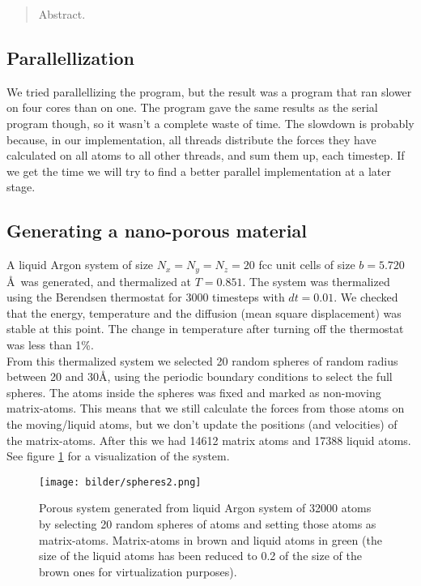 \begin{abstract}
Abstract.
\end{abstract}

\subsection*{Parallellization}
We tried parallellizing the program, but the result was a program that ran slower on four cores than on one. The program gave the same results as the serial program though, so it wasn't a complete waste of time. The slowdown is probably because, in our implementation, all threads distribute the forces they have calculated on all atoms to all other threads, and sum them up, each timestep. If we get the time we will try to find a better parallel implementation at a later stage.

\subsection*{Generating a nano-porous material}
\setcounter{equation}{1}
A liquid Argon system of size $N_x = N_y = N_z = 20$ fcc unit cells of size $b = 5.720$\AA\ was generated, and thermalized at $T = 0.851$. The system was thermalized using the Berendsen thermostat for 3000 timesteps with $dt = 0.01$. We checked that the energy, temperature and the diffusion (mean square displacement) was stable at this point. The change in temperature after turning off the thermostat was less than 1\%. \\

From this thermalized system we selected 20 random spheres of random radius between 20 and 30\AA, using the periodic boundary conditions to select the full spheres. The atoms inside the spheres was fixed and marked as non-moving matrix-atoms. This means that we still calculate the forces from those atoms on the moving/liquid atoms, but we don't update the positions (and velocities) of the matrix-atoms. After this we had 14612 matrix atoms and 17388 liquid atoms. See figure \ref{fig:spheres} for a visualization of the system. \\

\begin{figure}[ht!]
    \centering
    \texttt{[image: bilder/spheres2.png]}
    \parbox{0.8\textwidth}{
        \caption{
            \small{
                Porous system generated from liquid Argon system of 32000 atoms by selecting 20 random spheres of atoms and setting those atoms as matrix-atoms. Matrix-atoms in brown and liquid atoms in green (the size of the liquid atoms has been reduced to 0.2 of the size of the brown ones for virtualization purposes).
            }
            \label{fig:spheres}
        }
    }
\end{figure}

